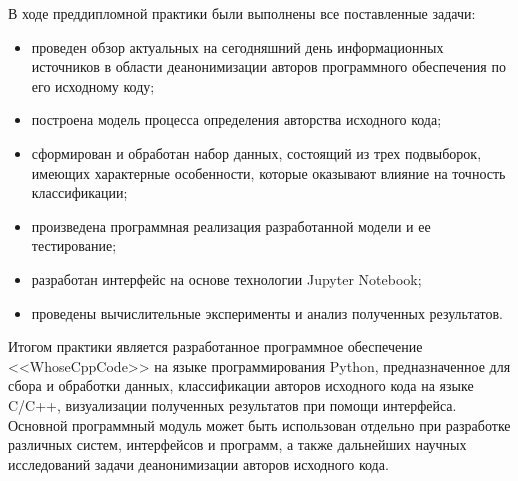 В ходе преддипломной практики были выполнены все поставленные задачи:
\begin{itemize}
 \item проведен обзор актуальных на сегодняшний день информационных источников в области деанонимизации
 авторов программного обеспечения по его исходному коду;
 \item построена модель процесса определения авторства исходного кода;
 \item сформирован и обработан набор данных, состоящий из трех подвыборок, имеющих характерные особенности,
 которые оказывают влияние на точность классификации;
 \item произведена программная реализация разработанной модели и ее тестирование;
 \item разработан интерфейс на основе технологии Jupyter Notebook;
 \item проведены вычислительные эксперименты и анализ полученных результатов.
\end{itemize}

Итогом практики является разработанное программное обеспечение <<WhoseCppCode>> на языке
программирования Python, предназначенное для сбора и обработки данных,
классификации авторов исходного кода на языке C/C++,
визуализации полученных результатов при помощи интерфейса. Основной программный модуль может быть использован
отдельно при разработке различных систем, интерфейсов и программ, а также дальнейших
научных исследований задачи деанонимизации авторов исходного кода. 



